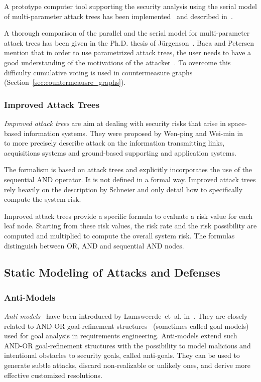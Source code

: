 \documentclass[a4paper]{article}
\begin{document}
A prototype computer tool supporting the security analysis using the serial
model of multi-parameter attack trees has been implemented~\cite{Program4} and
described in~\cite{AndrusenkoMaster}.

A thorough comparison of the parallel and the serial model for multi-parameter
attack trees has been given in the Ph.D. thesis of J\"{u}rgenson~\cite{Jurg}.
Baca and Petersen mention that in order to use parametrized attack trees, the 
user needs to have a good understanding of the motivations of the 
attacker~\cite{BaPe}. To overcome this difficulty cumulative voting is used in 
countermeasure graphs (Section~\ref{sec:countermeausre_graphs}).


\subsubsection{Improved Attack Trees} 
\label{sec:improved_attack_trees}

\emph{Improved attack trees} are aim at dealing with security risks that arise
in space-based information systems. They were proposed by Wen-ping and Wei-min
in~~\cite{WeWe} to more precisely describe attack on the information
transmitting links, acquisitions systems and ground-based supporting and
application systems.

The formalism is based on attack trees and explicitly incorporates the use of
the sequential AND operator. It is not defined in a formal way. Improved
attack trees rely heavily on the description by Schneier and only
detail how to specifically compute the system risk.

Improved attack trees provide a specific formula to evaluate a risk value for
each leaf node. Starting from these risk values, the risk rate and the risk
possibility are computed and multiplied to compute the overall system risk.
The formulas distinguish between OR, AND and sequential AND nodes.

\subsection{Static Modeling of Attacks and Defenses}
\label{sec:both_static}

\subsubsection{Anti-Models} 
\label{sec:obstacle_trees}

\emph{Anti-models}~\cite{LaBrLaJa} have been introduced by Lamsweerde~et~al.
in~. They are closely related to AND-OR goal-refinement 
structures~\cite{LaLe} (sometimes called goal models) used for goal analysis in
requirements engineering. Anti-models extend such AND-OR goal-refinement
structures with the possibility to model malicious and intentional obstacles to
security goals, called anti-goals. They can be used to generate subtle attacks,
discard non-realizable or unlikely ones, and derive more effective customized
resolutions.
\end{document}
